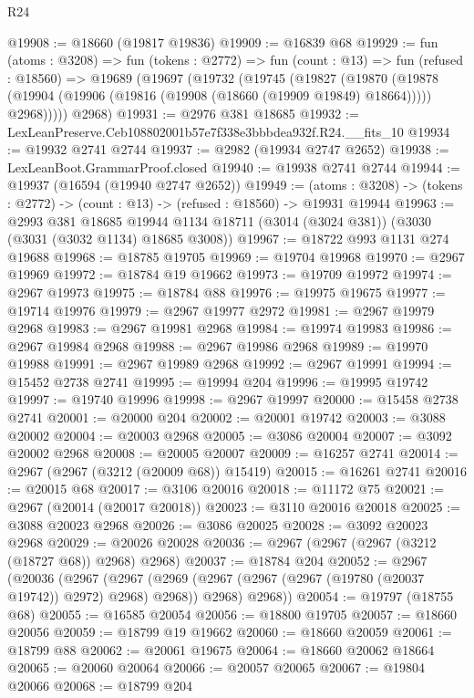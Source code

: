 \begin{lexlean}{R24}
\begin{coremodule}
@19908 := @18660 (@19817 @19836)
@19909 := @16839 @68
@19929 := fun (atoms : @3208) =>
  fun (tokens : @2772) =>
  fun (count : @13) =>
  fun (refused : @18560) =>
  @19689
    (@19697
      (@19732
        (@19745
          (@19827
            (@19870
              (@19878 (@19904 (@19906 (@19816 (@19908 (@18660 (@19909 @19849) @18664))))) @2968)))))
      @2968)
@19931 := @2976 @381 @18685
@19932 := LexLeanPreserve.Ceb108802001b57e7f338e3bbbdea932f.R24.__fits_10
@19934 := @19932 @2741 @2744
@19937 := @2982 (@19934 @2747 @2652)
@19938 := LexLeanBoot.GrammarProof.closed
@19940 := @19938 @2741 @2744
@19944 := @19937 (@16594 (@19940 @2747 @2652))
@19949 := (atoms : @3208) ->
  (tokens : @2772) -> (count : @13) -> (refused : @18560) -> @19931 @19944
@19963 := @2993
    @381
    @18685
    @19944
    @1134
    @18711
    (@3014 (@3024 @381))
    (@3030 (@3031 (@3032 @1134) @18685 @3008))
@19967 := @18722 @993 @1131 @274 @19688
@19968 := @18785 @19705
@19969 := @19704 @19968
@19970 := @2967 @19969
@19972 := @18784 @19 @19662
@19973 := @19709 @19972
@19974 := @2967 @19973
@19975 := @18784 @88
@19976 := @19975 @19675
@19977 := @19714 @19976
@19979 := @2967 @19977 @2972
@19981 := @2967 @19979 @2968
@19983 := @2967 @19981 @2968
@19984 := @19974 @19983
@19986 := @2967 @19984 @2968
@19988 := @2967 @19986 @2968
@19989 := @19970 @19988
@19991 := @2967 @19989 @2968
@19992 := @2967 @19991
@19994 := @15452 @2738 @2741
@19995 := @19994 @204
@19996 := @19995 @19742
@19997 := @19740 @19996
@19998 := @2967 @19997
@20000 := @15458 @2738 @2741
@20001 := @20000 @204
@20002 := @20001 @19742
@20003 := @3088 @20002
@20004 := @20003 @2968
@20005 := @3086 @20004
@20007 := @3092 @20002 @2968
@20008 := @20005 @20007
@20009 := @16257 @2741
@20014 := @2967 (@2967 (@3212 (@20009 @68)) @15419)
@20015 := @16261 @2741
@20016 := @20015 @68
@20017 := @3106 @20016
@20018 := @11172 @75
@20021 := @2967 (@20014 (@20017 @20018))
@20023 := @3110 @20016 @20018
@20025 := @3088 @20023 @2968
@20026 := @3086 @20025
@20028 := @3092 @20023 @2968
@20029 := @20026 @20028
@20036 := @2967 (@2967 (@2967 (@3212 (@18727 @68)) @2968) @2968)
@20037 := @18784 @204
@20052 := @2967
    (@20036
      (@2967
        (@2967 (@2969 (@2967 (@2967 (@2967 (@19780 (@20037 @19742)) @2972) @2968) @2968)) @2968)
        @2968))
@20054 := @19797 (@18755 @68)
@20055 := @16585 @20054
@20056 := @18800 @19705
@20057 := @18660 @20056
@20059 := @18799 @19 @19662
@20060 := @18660 @20059
@20061 := @18799 @88
@20062 := @20061 @19675
@20064 := @18660 @20062 @18664
@20065 := @20060 @20064
@20066 := @20057 @20065
@20067 := @19804 @20066
@20068 := @18799 @204

\end{coremodule}
\end{lexlean}

